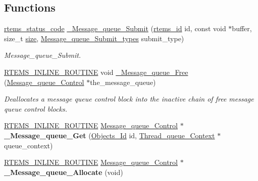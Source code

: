 \subsection*{Functions}
\begin{DoxyCompactItemize}
\item 
\mbox{\hyperlink{group__ClassicStatus_ga545d41846817eaba6143d52ee4d9e9fe}{rtems\+\_\+status\+\_\+code}} \mbox{\hyperlink{group__ClassicMessageQueueImpl_ga9b81aed474d2572b973f79d94dddacc5}{\+\_\+\+Message\+\_\+queue\+\_\+\+Submit}} (\mbox{\hyperlink{group__ClassicTasks_gab20892b814dced7dd4e5b9bf42becd57}{rtems\+\_\+id}} id, const void $\ast$buffer, size\+\_\+t \mbox{\hyperlink{sun4u_2tte_8h_a245260f6f74972558f61b85227df5aae}{size}}, \mbox{\hyperlink{group__ClassicMessageQueueImpl_ga488f0920d255344bbb3b76a23ad3ecc7}{Message\+\_\+queue\+\_\+\+Submit\+\_\+types}} submit\+\_\+type)
\begin{DoxyCompactList}\small\item\em Message\+\_\+queue\+\_\+\+Submit. \end{DoxyCompactList}\item 
\mbox{\hyperlink{group__RTEMSScoreBaseDefs_gac216239df231d5dbd15e3520b0b9313f}{R\+T\+E\+M\+S\+\_\+\+I\+N\+L\+I\+N\+E\+\_\+\+R\+O\+U\+T\+I\+NE}} void \mbox{\hyperlink{group__ClassicMessageQueueImpl_gabfd337c2b1bf986059d7bfea27b50a7d}{\+\_\+\+Message\+\_\+queue\+\_\+\+Free}} (\mbox{\hyperlink{structMessage__queue__Control}{Message\+\_\+queue\+\_\+\+Control}} $\ast$the\+\_\+message\+\_\+queue)
\begin{DoxyCompactList}\small\item\em Deallocates a message queue control block into the inactive chain of free message queue control blocks. \end{DoxyCompactList}\item 
\mbox{\label{group__ClassicMessageQueueImpl_ga2ae3fbe2f3c43ea7a991289339222f85}} 
\mbox{\hyperlink{group__RTEMSScoreBaseDefs_gac216239df231d5dbd15e3520b0b9313f}{R\+T\+E\+M\+S\+\_\+\+I\+N\+L\+I\+N\+E\+\_\+\+R\+O\+U\+T\+I\+NE}} \mbox{\hyperlink{structMessage__queue__Control}{Message\+\_\+queue\+\_\+\+Control}} $\ast$ {\bfseries \+\_\+\+Message\+\_\+queue\+\_\+\+Get} (\mbox{\hyperlink{group__RTEMSScoreObject_ga5821f52a51072941bdd603e542d0863e}{Objects\+\_\+\+Id}} id, \mbox{\hyperlink{structThread__queue__Context}{Thread\+\_\+queue\+\_\+\+Context}} $\ast$queue\+\_\+context)
\item 
\mbox{\label{group__ClassicMessageQueueImpl_ga7fecd1a88eefb5ad554e06e265792d1f}} 
\mbox{\hyperlink{group__RTEMSScoreBaseDefs_gac216239df231d5dbd15e3520b0b9313f}{R\+T\+E\+M\+S\+\_\+\+I\+N\+L\+I\+N\+E\+\_\+\+R\+O\+U\+T\+I\+NE}} \mbox{\hyperlink{structMessage__queue__Control}{Message\+\_\+queue\+\_\+\+Control}} $\ast$ {\bfseries \+\_\+\+Message\+\_\+queue\+\_\+\+Allocate} (void)
\end{DoxyCompactItemize}
